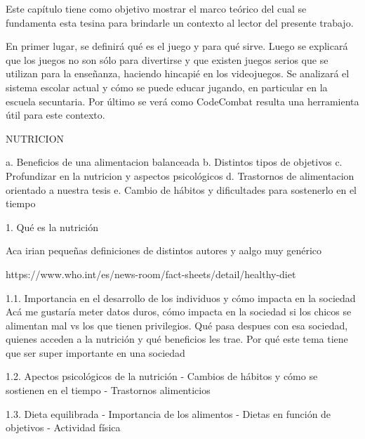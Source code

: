 Este capítulo tiene como objetivo mostrar el marco teórico del cual se fundamenta esta tesina para brindarle un contexto al lector del presente trabajo. 

En primer lugar, se definirá qué es el juego y para qué sirve. Luego se explicará que los juegos no son sólo para divertirse y que existen juegos serios que se utilizan para la enseñanza, haciendo hincapié en los videojuegos. Se analizará el sistema escolar actual y cómo se puede educar jugando, en particular en la escuela secuntaria. Por último se verá como CodeCombat resulta una herramienta útil para este contexto.


NUTRICION 

	a. Beneficios de una alimentacion balanceada
	b. Distintos tipos de objetivos
	c. Profundizar en la nutricion y aspectos psicológicos
    d. Trastornos de alimentacion orientado a nuestra tesis
    e. Cambio de hábitos y dificultades para sostenerlo en el tiempo


1. Qué es la nutrición 

Aca irian pequeñas definiciones de distintos autores y aalgo muy genérico

https://www.who.int/es/news-room/fact-sheets/detail/healthy-diet

1.1. Importancia en el desarrollo de los individuos y cómo impacta en la sociedad
Acá me gustaría meter datos duros, cómo impacta en la sociedad si los chicos se alimentan mal vs los que tienen privilegios. Qué pasa despues con esa sociedad, quienes acceden  a la nutrición y qué beneficios les trae. Por qué este tema tiene que ser super importante en una sociedad

1.2. Apectos psicológicos de la nutrición
  - Cambios de hábitos y cómo se sostienen en el tiempo
  - Trastornos alimenticios

1.3. Dieta equilibrada
	- Importancia de los alimentos 
	- Dietas en función de objetivos
	- Actividad física

